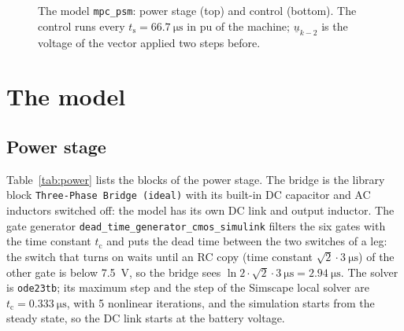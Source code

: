 \documentclass[11pt,a4paper]{scrartcl}
\newcommand{\ped}[1]{_{\mathrm{#1}}}
\newcommand{\code}[1]{\texttt{#1}}
\begin{document}
\begin{onehalfspace}
\begin{figure}[H]
{}
	\caption{The model \code{mpc\_psm}: power stage (top) and control (bottom). The control runs every $t\ped{s} = \SI{66.7}{\micro\second}$ in pu of the machine; $\underline{u}_{k-2}$ is the voltage of the vector applied two steps before.}
	\label{fig:overview}
\end{figure}

\section{The model}
\label{sec:model}

\subsection{Power stage}

Table~\ref{tab:power} lists the blocks of the power stage. The bridge is the library block \code{Three-Phase Bridge (ideal)} \cite{library_repo} with its built-in DC capacitor and AC inductors switched off: the model has its own DC link and output inductor. The gate generator \code{dead\_time\_generator\_cmos\_simulink} filters the six gates with the time constant $t\ped{c}$ and puts the dead time between the two switches of a leg: the switch that turns on waits until an RC copy (time constant $\sqrt2\cdot\SI{3}{\micro\second}$) of the other gate is below \SI{7.5}{\volt}, so the bridge sees $\ln 2\cdot\sqrt2\cdot\SI{3}{\micro\second} = \SI{2.94}{\micro\second}$. The solver is \code{ode23tb}; its maximum step and the step of the Simscape local solver are $t\ped{c} = \SI{0.333}{\micro\second}$, with 5 nonlinear iterations, and the simulation starts from the steady state, so the DC link starts at the battery voltage.


\end{onehalfspace}
\end{document}
